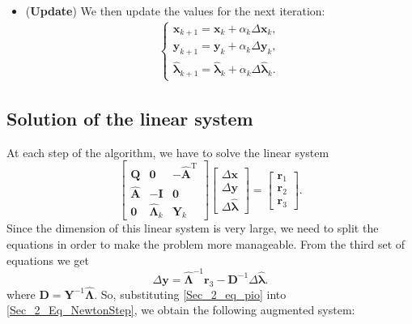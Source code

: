 \begin{itemize}
    \item (\textbf{Update}) We then update the values for the next iteration:
    \begin{align}
    \begin{cases}
        \bm{x}_{k+1} = \bm{x}_{k} + \alpha_{k}\Delta\bm{x}_k,\\
        \bm{y}_{k+1} = \bm{y}_{k} + \alpha_{k}\Delta\bm{y}_k,\\
        \hat{\bm{\lambda}}_{k+1} = \hat{\bm{\lambda}}_{k} + \alpha_{k}\Delta\hat{\bm{\lambda}}_k.
    \end{cases}\label{Sec3_Eq_sugoma}
    \end{align}
\end{itemize}

\subsection{Solution of the linear system} \label{ls_sol}
At each step of the algorithm, we have to solve the linear system
\begin{equation} \label{Sec_2_Eq_NewtonStep}
    \begin{bmatrix}
        \mathbf{Q} & \mathbf{0} & -\hat{\mathbf{A}}^\mathrm{T}\\
        \hat{\mathbf{A}} & -\mathbf{I} & \mathbf{0} \\
        \mathbf{0} & \hat{\mathbf{\Lambda}}_k &\mathbf{Y}_k
    \end{bmatrix} 
    \begin{bmatrix}
        \Delta \bm{x} \\ \Delta \bm{y} \\ \Delta \hat{\bm{\lambda}} 
    \end{bmatrix} =
    \begin{bmatrix}
        \bm{r}_1 \\ \bm{r}_2 \\ \bm{r}_3
    \end{bmatrix}.
\end{equation}
%
Since the dimension of this linear system is very large, we need to split the equations in order to make the problem more manageable. From the third set of equations we get
\begin{equation} \label{Sec_2_eq_pio}
    \Delta \bm{y} = \hat{\mathbf{\Lambda}}^{-1} \bm{r}_3 -  \mathbf{D}^{-1}\Delta \hat{\bm{\lambda}}.
\end{equation}
where $\mathbf{D} = \mathbf{Y}^{-1}\hat{\mathbf{\Lambda}}$.
So, substituting \ref{Sec_2_eq_pio} into \ref{Sec_2_Eq_NewtonStep}, we obtain the following augmented system:
